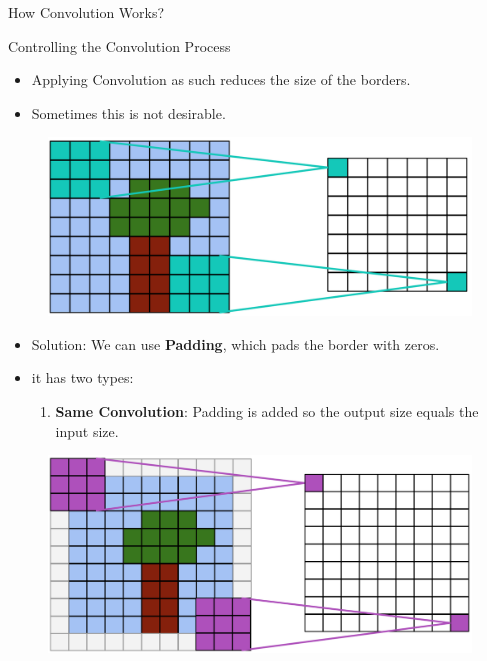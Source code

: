 \documentclass[10pt]{beamer}
\theoremstyle{remark}
\theoremstyle{definition}
\begin{document}
\begin{frame}[allowframebreaks]{How Convolution Works?}
    
\end{frame}


\begin{frame}[allowframebreaks]{Controlling the Convolution Process}
\begin{itemize}
    \item Applying Convolution as such reduces the size of the borders.
    \item Sometimes this is not desirable.
\end{itemize}


\begin{figure}
\centering
\includegraphics[width=1.0\textwidth,height=0.7\textheight,keepaspectratio]{./images/pad_1.png}
\end{figure}

\framebreak

\begin{itemize}
    \item Solution: We can use \textbf{Padding}, which pads the border with zeros.
    \item it has two types:
    \begin{enumerate}
    \item \textbf{Same Convolution}: Padding is added so the output size equals the input size.
    \end{enumerate}
\end{itemize}


\begin{figure}
\centering
\includegraphics[width=1.0\textwidth,height=0.8\textheight,keepaspectratio]{./images/pad_3.png}
\end{figure}



\end{frame}
\end{document}
